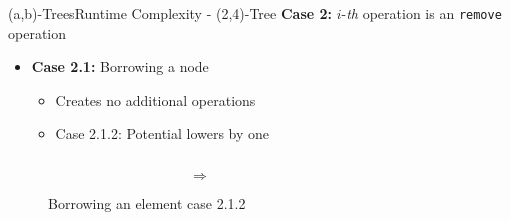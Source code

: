 \begin{frame}{(a,b)-Trees}{Runtime Complexity - (2,4)-Tree}
  \textbf{Case 2:}
  {\color{Mittel-Blau}$i$}-\textit{th} operation is an
  \texttt{\color{Mittel-Blau}remove} operation
  \begin{itemize}
    \item
    \textbf{Case 2.1:} Borrowing a node
    \begin{itemize}
      \item
      Creates no additional operations
      \item
      Case 2.1.2: Potential lowers by one
    \end{itemize}
  \end{itemize}
  \begin{figure}
    \begin{columns}
      \begin{column}{0.35\linewidth}
        \begin{adjustbox}{width=\linewidth}
          
        \end{adjustbox}
      \end{column}
      \begin{column}{0.1\linewidth}
        \begin{center}
          $\Rightarrow$
        \end{center}
      \end{column}
      \begin{column}{0.35\linewidth}
        \begin{adjustbox}{width=\linewidth}
          
        \end{adjustbox}
      \end{column}
    \end{columns}
    \caption{Borrowing an element case 2.1.2}
    \label{fig:a_b_tree:move_potential_2}
  \end{figure}
\end{frame}


